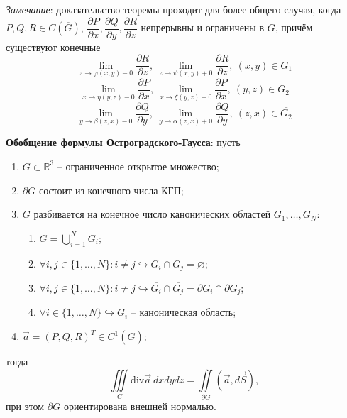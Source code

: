 \documentclass[12pt, a4paper, reqno]{article}
\begin{document}
    \textit{Замечание}: доказательство теоремы проходит для более общего случая, когда
    $P, Q, R \in C(\overline{G})$, $\dfrac{\partial P}{\partial x}, \dfrac{\partial Q}{\partial y},
    \dfrac{\partial R}{\partial z}$ непрерывны и ограничены в $G$, причём существуют конечные
    \begin{equation*}
        \lim\limits_{z \to \varphi(x, y) - 0} \frac{\partial R}{\partial z},\
        \lim\limits_{z \to \psi(x, y) + 0} \frac{\partial R}{\partial z},\ (x, y) \in \overline{G_1}
    \end{equation*}
    \begin{equation*}
        \lim\limits_{x \to \eta(y, z) - 0} \frac{\partial P}{\partial x},\
        \lim\limits_{x \to \xi(y, z) + 0} \frac{\partial P}{\partial x},\ (y, z) \in \overline{G_2}
    \end{equation*}
    \begin{equation*}
        \lim\limits_{y \to \beta(z, x) - 0} \frac{\partial Q}{\partial y},\
        \lim\limits_{y \to \alpha(z, x) + 0} \frac{\partial Q}{\partial y},\ (z, x) \in \overline{G_2}
    \end{equation*}

    \textbf{Обобщение формулы Остроградского-Гаусса}: пусть
    \begin{enumerate}
        \item $G \subset \mathbb{R}^3$ -- ограниченное открытое множество;
        \item $\partial G$ состоит из конечного числа КГП;
        \item $G$ разбивается на конечное число канонических областей $G_1, \ldots, G_N$:
            \begin{enumerate}
                \item $\overline{G} = \bigcup\limits_{i = 1}^{N} \overline{G_i}$;
                \item $\forall i, j \in \{1, \ldots, N\}: i \neq j \hookrightarrow
                      G_i \cap G_j = \varnothing$;
                \item $\forall i, j \in \{1, \ldots, N\}: i \neq j \hookrightarrow
                      \overline{G_i} \cap \overline{G_j} = \partial G_i \cap \partial G_j$;
                \item $\forall i \in \{1, \ldots, N\} \hookrightarrow G_i$ -- каноническая область;
            \end{enumerate}
        \item $\vec{a} = (P, Q, R)^T \in C^1(\overline{G})$;
    \end{enumerate}
    тогда
    \begin{equation*}
        \iiint\limits_{G}\text{div}\vec{a}\ dx dy dz = \iint\limits_{\partial G}(\vec{a}, d\vec{S}),
    \end{equation*}
    при этом $\partial G$ ориентирована внешней нормалью.
\end{document}
